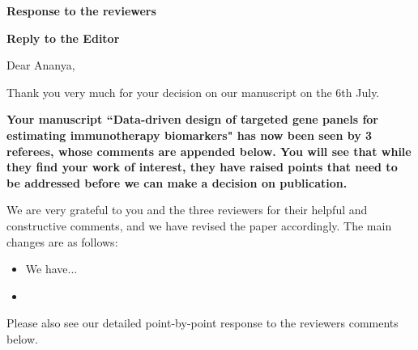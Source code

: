 \documentclass[12pt]{article}
\begin{document}
\begin{center}
\Large{\textbf{Response to the reviewers}}
\end{center}

\vspace{0.2in}

{\large \textbf{Reply to the Editor}}

Dear Ananya,

Thank you very much for your decision on our manuscript on the 6th July.

\textbf{Your manuscript ``Data-driven design of targeted gene panels for estimating immunotherapy biomarkers" has now been seen by 3 referees, whose comments are appended below. You will see that while they find your work of interest, they have raised points that need to be addressed before we can make a decision on publication. }

We are very grateful to you and the three reviewers for their helpful and constructive comments, and we have revised the paper accordingly.  The main changes are as follows: 
\begin{itemize}
    \item We have...  
    \item {} 
\end{itemize}
Please also see our detailed point-by-point response to the reviewers comments below.  

\end{document}
